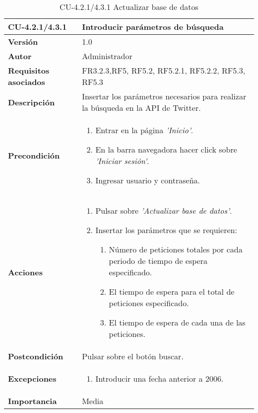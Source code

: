 \begin{table}[h!]
	\centering
	\begin{tabularx}{\linewidth}{ p{} p{} }
		\toprule
		\textbf{CU-4.2.1/4.3.1}    & \textbf{Introducir parámetros de búsqueda}\\
		\toprule
		\textbf{Versión}              & 1.0    \\
		\textbf{Autor}                & Administrador \\
		\textbf{Requisitos asociados} & FR3.2.3,RF5, RF5.2, RF5.2.1, RF5.2.2, RF5.3, RF5.3\\
		\textbf{Descripción}          & Insertar los parámetros necesarios para realizar la búsqueda en la API de Twitter.\\
        \textbf{Precondición}         &  
  	\begin{enumerate}
			\def\labelenumi{\arabic{enumi}.}
			\tightlist
			\item Entrar en la página \textit{'Inicio'}.
			\item En la barra navegadora hacer click sobre \textit{'Iniciar sesión'}.
            \item Ingresar usuario y contraseña.
		\end{enumerate}\\
		\textbf{Acciones}             &
		\begin{enumerate}
			\def\labelenumi{\arabic{enumi}.}
			\tightlist
			\item Pulsar sobre \textit{'Actualizar base de datos'}.
            \item Insertar los parámetros que se requieren:
            \begin{enumerate}
    			\def\labelenumi{\arabic{enumi}.}
    			\tightlist
    			\item Número de peticiones totales por cada periodo de tiempo de espera especificado.
                \item El tiempo de espera para el total de peticiones especificado.
                \item El tiempo de espera de cada una de las peticiones.
		  \end{enumerate}
            
		\end{enumerate}\\
		\textbf{Postcondición}     &   Pulsar sobre el botón buscar. \\
		\textbf{Excepciones}          & 
        \begin{enumerate}
            \def\labelenumi{\arabic{enumi}.}
            \tightlist
            \item Introducir una fecha anterior a 2006.
		\end{enumerate}\\
		\textbf{Importancia}          & Media\\
		\bottomrule
	\end{tabularx}
	\caption{CU-4.2.1/4.3.1 Actualizar base de datos}
\end{table}


